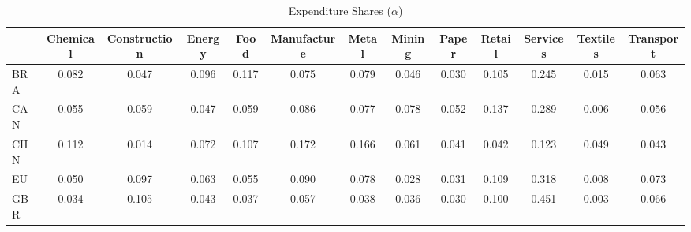 \begin{table}[htbp]
\centering
\caption{Expenditure Shares ($\alpha$)} 
\label{tab:alpha}
\begin{tabular}{lcccccccccccc}
  \hline
 & Chemical & Construction & Energy & Food & Manufacture & Metal & Mining & Paper & Retail & Services & Textiles & Transport \\ 
  \hline
BRA & \textcolor[RGB]{94,61,162}{0.082} & \textcolor[RGB]{174,113,81}{0.047} & \textcolor[RGB]{74,48,181}{0.096} & \textcolor[RGB]{32,21,223}{0.117} & \textcolor[RGB]{110,72,144}{0.075} & \textcolor[RGB]{100,65,155}{0.079} & \textcolor[RGB]{178,115,76}{0.046} & \textcolor[RGB]{225,146,30}{0.030} & \textcolor[RGB]{55,36,200}{0.105} & \textcolor[RGB]{11,7,244}{0.245} & \textcolor[RGB]{238,154,17}{0.015} & \textcolor[RGB]{132,85,123}{0.063} \\ 
  CAN & \textcolor[RGB]{151,98,104}{0.055} & \textcolor[RGB]{140,91,115}{0.059} & \textcolor[RGB]{176,114,79}{0.047} & \textcolor[RGB]{142,92,113}{0.059} & \textcolor[RGB]{89,58,166}{0.086} & \textcolor[RGB]{108,70,147}{0.077} & \textcolor[RGB]{104,67,151}{0.078} & \textcolor[RGB]{164,106,91}{0.052} & \textcolor[RGB]{23,15,232}{0.137} & \textcolor[RGB]{8,5,246}{0.289} & \textcolor[RGB]{249,161,6}{0.006} & \textcolor[RGB]{147,95,108}{0.056} \\ 
  CHN & \textcolor[RGB]{40,26,215}{0.112} & \textcolor[RGB]{240,155,15}{0.014} & \textcolor[RGB]{121,78,134}{0.072} & \textcolor[RGB]{53,34,202}{0.107} & \textcolor[RGB]{17,11,238}{0.172} & \textcolor[RGB]{19,12,236}{0.166} & \textcolor[RGB]{134,87,121}{0.061} & \textcolor[RGB]{200,129,55}{0.041} & \textcolor[RGB]{189,122,66}{0.042} & \textcolor[RGB]{28,18,227}{0.123} & \textcolor[RGB]{170,110,85}{0.049} & \textcolor[RGB]{185,120,70}{0.043} \\ 
  EU & \textcolor[RGB]{168,109,87}{0.050} & \textcolor[RGB]{68,44,187}{0.097} & \textcolor[RGB]{130,84,125}{0.063} & \textcolor[RGB]{153,99,102}{0.055} & \textcolor[RGB]{83,54,172}{0.090} & \textcolor[RGB]{102,66,153}{0.078} & \textcolor[RGB]{230,148,26}{0.028} & \textcolor[RGB]{223,144,32}{0.031} & \textcolor[RGB]{45,29,210}{0.109} & \textcolor[RGB]{4,3,251}{0.318} & \textcolor[RGB]{244,158,11}{0.008} & \textcolor[RGB]{117,76,138}{0.073} \\ 
  GBR & \textcolor[RGB]{221,143,34}{0.034} & \textcolor[RGB]{57,37,198}{0.105} & \textcolor[RGB]{183,118,72}{0.043} & \textcolor[RGB]{208,135,47}{0.037} & \textcolor[RGB]{144,94,110}{0.057} & \textcolor[RGB]{206,133,49}{0.038} & \textcolor[RGB]{215,139,40}{0.036} & \textcolor[RGB]{227,147,28}{0.030} & \textcolor[RGB]{62,40,193}{0.100} & \textcolor[RGB]{2,1,253}{0.451} & \textcolor[RGB]{253,164,2}{0.003} & \textcolor[RGB]{128,82,128}{0.066} \\ 

\end{tabular}
\end{table}
